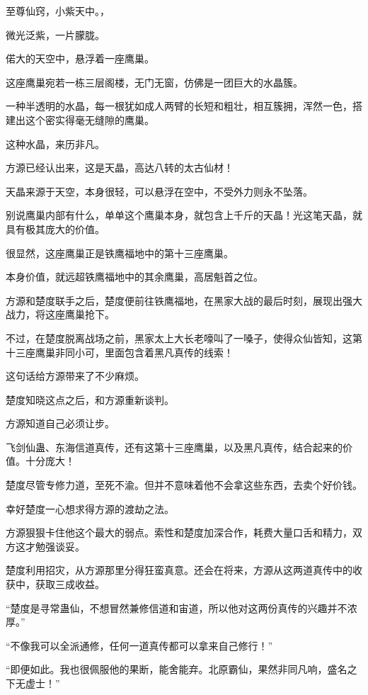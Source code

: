 
\begin{this_body}

至尊仙窍，小紫天中。，

微光泛紫，一片朦胧。

偌大的天空中，悬浮着一座鹰巢。

这座鹰巢宛若一栋三层阁楼，无门无窗，仿佛是一团巨大的水晶簇。

一种半透明的水晶，每一根犹如成人两臂的长短和粗壮，相互簇拥，浑然一色，搭建出这个密实得毫无缝隙的鹰巢。

这种水晶，来历非凡。

方源已经认出来，这是天晶，高达八转的太古仙材！

天晶来源于天空，本身很轻，可以悬浮在空中，不受外力则永不坠落。

别说鹰巢内部有什么，单单这个鹰巢本身，就包含上千斤的天晶！光这笔天晶，就具有极其庞大的价值。

很显然，这座鹰巢正是铁鹰福地中的第十三座鹰巢。

本身价值，就远超铁鹰福地中的其余鹰巢，高居魁首之位。

方源和楚度联手之后，楚度便前往铁鹰福地，在黑家大战的最后时刻，展现出强大战力，将这座鹰巢抢下。

不过，在楚度脱离战场之前，黑家太上大长老嚎叫了一嗓子，使得众仙皆知，这第十三座鹰巢非同小可，里面包含着黑凡真传的线索！

这句话给方源带来了不少麻烦。

楚度知晓这点之后，和方源重新谈判。

方源知道自己必须让步。

飞剑仙蛊、东海信道真传，还有这第十三座鹰巢，以及黑凡真传，结合起来的价值。十分庞大！

楚度尽管专修力道，至死不渝。但并不意味着他不会拿这些东西，去卖个好价钱。

幸好楚度一心想求得方源的渡劫之法。

方源狠狠卡住他这个最大的弱点。索性和楚度加深合作，耗费大量口舌和精力，双方这才勉强谈妥。

楚度利用招灾，从方源那里分得狂蛮真意。还会在将来，方源从这两道真传中的收获中，获取三成收益。

“楚度是寻常蛊仙，不想冒然兼修信道和宙道，所以他对这两份真传的兴趣并不浓厚。”

“不像我可以全派通修，任何一道真传都可以拿来自己修行！”

“即便如此。我也很佩服他的果断，能舍能弃。北原霸仙，果然非同凡响，盛名之下无虚士！”


\end{this_body}
